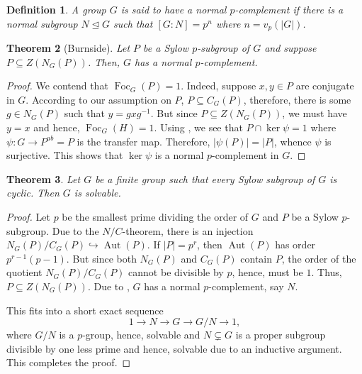 \documentclass[12pt]{article}
\theoremstyle{thmstyle}
\newtheorem{theorem}{Theorem}[section]
\theoremstyle{defstyle}
\newtheorem{definition}[theorem]{Definition}
\newcommand{\Aut}{\operatorname{Aut}}
\newcommand{\Foc}{\operatorname{Foc}}
\begin{document}
\begin{definition}
    A group $G$ is said to have a \emph{normal $p$-complement} if there is a normal subgroup $N\unlhd G$ such that $[G: N] = p^n$ where $n = v_p(|G|)$.
\end{definition}

\begin{theorem}[Burnside]
    Let $P$ be a Sylow $p$-subgroup of $G$ and suppose $P\subseteq Z(N_G(P))$. Then, $G$ has a normal $p$-complement.
\end{theorem}
\begin{proof}
    We contend that $\Foc_G(P) = 1$. Indeed, suppose $x, y\in P$ are conjugate in $G$. According to our assumption on $P$, $P\subseteq C_G(P)$, therefore, there is some $g\in N_G(P)$ such that $y = gxg^{-1}$. But since $P\subseteq Z(N_G(P))$, we must have $y = x$ and hence, $\Foc_G(H) = 1$. Using , we see that $P\cap\ker\psi = 1$ where $\psi: G\to P^{ab} = P$ is the transfer map. Therefore, $|\psi(P)| = |P|$, whence $\psi$ is surjective. This shows that $\ker\psi$ is a normal $p$-complement in $G$.
\end{proof}

\begin{theorem}
    Let $G$ be a finite group such that every Sylow subgroup of $G$ is cyclic. Then $G$ is solvable.
\end{theorem}
\begin{proof}
    Let $p$ be the smallest prime dividing the order of $G$ and $P$ be a Sylow $p$-subgroup. Due to the $N/C$-theorem, there is an injection $N_G(P)/C_G(P)\hookrightarrow\Aut(P)$. If $|P| = p^r$, then $\Aut(P)$ has order $p^{r - 1}(p - 1)$. But since both $N_G(P)$ and $C_G(P)$ contain $P$, the order of the quotient $N_G(P)/C_G(P)$ cannot be divisible by $p$, hence, must be $1$. Thus, $P\subseteq Z(N_G(P))$. Due to , $G$ has a normal $p$-complement, say $N$. 

    This fits into a short exact sequence 
    \begin{equation*}
        1\to N\to G\to G/N\to 1,
    \end{equation*}
    where $G/N$ is a $p$-group, hence, solvable and $N\subsetneq G$ is a proper subgroup divisible by one less prime and hence, solvable due to an inductive argument. This completes the proof.
\end{proof}
\end{document}
